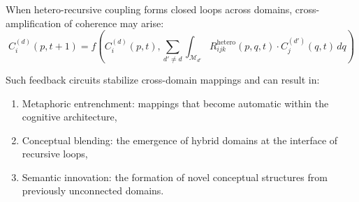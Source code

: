When hetero-recursive coupling forms closed loops across domains, cross-amplification of coherence may arise:
\begin{equation}
C_i^{(d)}(p, t+1) = f\left(C_i^{(d)}(p, t), \sum_{d' \neq d} \int_{\mathcal{M}_{d'}} R_{ijk}^{\text{hetero}}(p, q, t) \cdot C_j^{(d')}(q, t) \, dq\right)
\end{equation}

Such feedback circuits stabilize cross-domain mappings and can result in:
\begin{enumerate}
    \item Metaphoric entrenchment: mappings that become automatic within the cognitive architecture,
    \item Conceptual blending: the emergence of hybrid domains at the interface of recursive loops,
    \item Semantic innovation: the formation of novel conceptual structures from previously unconnected domains.
\end{enumerate}